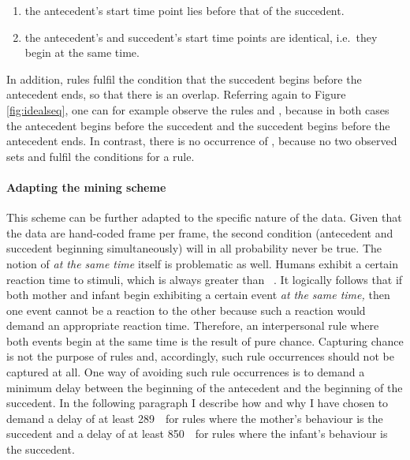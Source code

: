 \begin{enumerate}
	\item the antecedent's start time point lies before that of the succedent.
	\item the antecedent's and succedent's start time points are identical, i.e.\ they begin at the same time.
\end{enumerate}

In addition, rules fulfil the condition that the succedent begins before the antecedent ends, so that there is an overlap.
Referring again to Figure \ref{fig:idealseq}, one can for example observe the rules  and , because in both cases the antecedent begins before the succedent and the succedent begins before the antecedent ends.
In contrast, there is no occurrence of , because no two observed sets  and  fulfil the conditions for a rule.

\paragraph{Adapting the mining scheme}
This scheme can be further adapted to the specific nature of the data.
Given that the data are hand-coded frame per frame, the second condition (antecedent and succedent beginning simultaneously) will in all probability never be true.
The notion of \emph{at the same time} itself is problematic as well.
Humans exhibit a certain reaction time to stimuli, which is always greater than \zero~\ms.
It logically follows that if both mother and infant begin exhibiting a certain event \emph{at the same time,} then one event cannot be a reaction to the other because such a reaction would demand an appropriate reaction time.
Therefore, an interpersonal rule where both events begin at the same time is the result of pure chance.
Capturing chance is not the purpose of rules and, accordingly, such rule occurrences should not be captured at all.
One way of avoiding such rule occurrences is to demand a minimum delay between the beginning of the antecedent and the beginning of the succedent.
In the following paragraph I describe how and why I have chosen to demand a delay of at least 289~\ms\ for rules where the mother's behaviour is the succedent and a delay of at least 850~\ms\ for rules where the infant's behaviour is the succedent.

